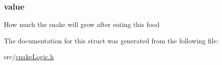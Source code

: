 \subsubsection[{\texorpdfstring{value}{value}}]{ value}\hypertarget{struct_food_a66236e78407f7f7560eb9ece512621c7}{}\label{struct_food_a66236e78407f7f7560eb9ece512621c7}
How much the snake will grow after eating this food 

The documentation for this struct was generated from the following file\+:\begin{DoxyCompactItemize}
\item 
src/\hyperlink{cnake_logic_8h}{cnake\+Logic.\+h}\end{DoxyCompactItemize}
